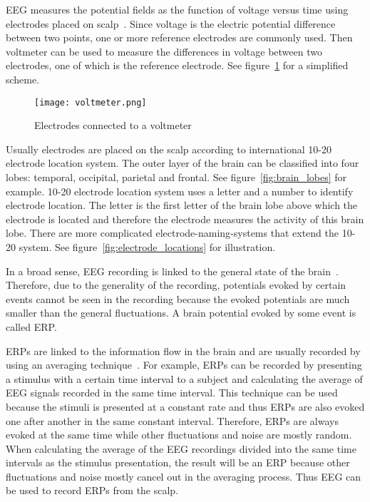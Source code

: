 \gls{EEG} measures the potential fields as the function of voltage versus time using electrodes placed on scalp~\cite{field_count}. Since voltage is the electric potential difference between two points, one or more reference electrodes are commonly used. Then voltmeter can be used to measure the differences in voltage between two electrodes, one of which is the reference electrode. See figure~\ref{fig:voltmeter} for a simplified scheme.

\begin{figure}[h!]
	\centering
	\texttt{[image: voltmeter.png]}
	\caption{Electrodes connected to a voltmeter~\cite[p.~120]{ERP}}
	\label{fig:voltmeter}
\end{figure}

Usually electrodes are placed on the scalp according to international 10-20 electrode location system. The outer layer of the brain can be classified into four lobes: temporal, occipital, parietal and frontal. See figure~\ref{fig:brain_lobes} for example. 10-20 electrode location system uses a letter and a number to identify electrode location. The letter is the first letter of the brain lobe above which the electrode is located and therefore the electrode measures the activity of this brain lobe. There are more complicated electrode-naming-systems that extend the 10-20 system. See figure~\ref{fig:electrode_locations} for illustration.

In a broad sense, \gls{EEG} recording is linked to the general state of the brain~\cite{VEP}. Therefore, due to the generality of the recording, potentials evoked by certain events cannot be seen in the recording because the evoked potentials are much smaller than the general fluctuations. A brain potential evoked by some event is called \gls{ERP}. 

\glspl{ERP} are linked to the information flow in the brain and are usually recorded by using an averaging technique~\cite{ERP}. For example, \glspl{ERP} can be recorded by presenting a stimulus with a certain time interval to a subject and calculating the average of \gls{EEG} signals recorded in the same time interval. This technique can be used because the stimuli is presented at a constant rate and thus \glspl{ERP} are also evoked one after another in the same constant interval. Therefore, \glspl{ERP} are always evoked at the same time while other fluctuations and noise are mostly random. When calculating the average of the \gls{EEG} recordings divided into the same time intervals as the stimulus presentation, the result will be an \gls{ERP} because other fluctuations and noise mostly cancel out in the averaging process. Thus \gls{EEG} can be used to record \glspl{ERP} from the scalp. 

